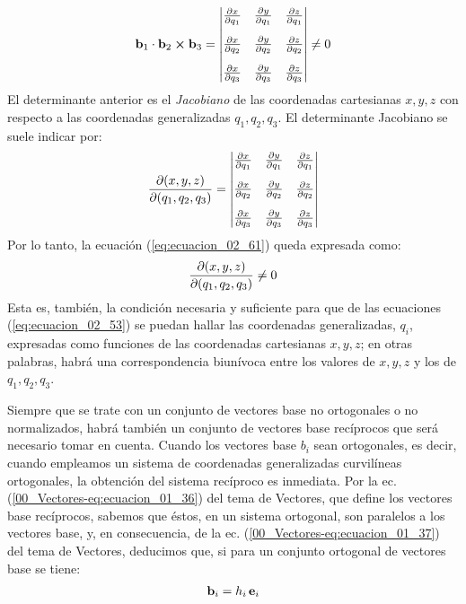 \documentclass[12pt]{article}
\begin{document}
\bgroup
\everymath{\displaystyle}
\begin{align}
    \vb{b}_{1} \cdot \vb{b}_{2} \cp \vb{b}_{3} = \mdet{
        \pdv{x}{q_{1}} & \pdv{y}{q_{1}} & \pdv{z}{q_{1}} \\[1em]
        \pdv{x}{q_{2}} & \pdv{y}{q_{2}} & \pdv{z}{q_{2}} \\[1em]
        \pdv{x}{q_{3}} & \pdv{y}{q_{3}} & \pdv{z}{q_{3}}
    } \neq 0
    \label{eq:ecuacion_02_61}
\end{align}
\egroup
El determinante anterior es el \emph{Jacobiano} de las coordenadas cartesianas $x, y, z$ con respecto a las coordenadas generalizadas $q_{1}, q_{2}, q_{3}$. El determinante Jacobiano se suele indicar por:
\bgroup
\everymath{\displaystyle}
\begin{align}
    \pdv{(x, y, z)}{(q_{1}, q_{2}, q_{3})} = \mdet{
        \pdv{x}{q_{1}} & \pdv{y}{q_{1}} & \pdv{z}{q_{1}} \\[1em]
        \pdv{x}{q_{2}} & \pdv{y}{q_{2}} & \pdv{z}{q_{2}} \\[1em]
        \pdv{x}{q_{3}} & \pdv{y}{q_{3}} & \pdv{z}{q_{3}}
    }
    \label{eq:ecuacion_02_62}
\end{align}
\egroup
Por lo tanto, la ecuación (\ref{eq:ecuacion_02_61}) queda expresada como:
\begin{align*}
    \pdv{(x, y, z)}{(q_{1}, q_{2}, q_{3})} \neq 0
\end{align*}
Esta es, también, la condición necesaria y suficiente para que de las ecuaciones (\ref{eq:ecuacion_02_53}) se puedan hallar las coordenadas generalizadas, $q_{i}$, expresadas como funciones de las coordenadas cartesianas $x, y, z$; en otras palabras, habrá una correspondencia biunívoca entre los valores de $x, y, z$ y los de $q_{1}, q_{2}, q_{3}$.
\par
Siempre que se trate con un conjunto de vectores base no ortogonales o no normalizados, habrá también un conjunto de vectores base recíprocos que será necesario tomar en cuenta. Cuando los vectores base $b_{i}$ sean ortogonales, es decir, cuando empleamos un sistema de coordenadas generalizadas curvilíneas ortogonales, la obtención del sistema recíproco es inmediata. Por la ec. (\ref{00_Vectores-eq:ecuacion_01_36}) del tema de Vectores, que define los vectores base recíprocos, sabemos que éstos, en un sistema ortogonal, son paralelos a los vectores base, y, en consecuencia, de la ec. (\ref{00_Vectores-eq:ecuacion_01_37}) del tema de Vectores, deducimos que, si para un conjunto ortogonal de vectores base se tiene:
\begin{align}
    \vb{b}_{i} = h_{i} \, \vb{e}_{i}
    \label{eq:ecuacion_02_63} 
\end{align}
\end{document}
